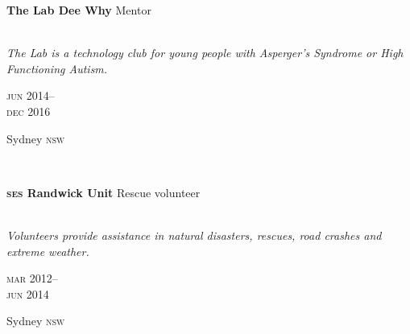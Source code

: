 \begin{minipage}[t]{0.75\textwidth}
\textbf{The Lab Dee Why}\phantom{..} Mentor \\
\\
{\small
\textit{The Lab is a technology club for young people with Asperger’s Syndrome or High Functioning Autism.}
\par}
\end{minipage}
\begin{minipage}[t]{0.25\textwidth}
{
\hfill \textsc{jun} 2014--\\ 
\hspace*{0pt} \hfill \textsc{dec} 2016
\par
{\small\hfill Sydney \textsc{nsw}}
}
\end{minipage}
\\

\begin{minipage}[t]{0.75\textwidth}
\textbf{\textsc{ses} Randwick Unit}\phantom{..} Rescue volunteer\\
\\
{\small
\textit{Volunteers provide assistance in natural disasters, rescues, road crashes and extreme weather.}
\par}
\end{minipage}
\begin{minipage}[t]{0.25\textwidth}
{
\hfill \textsc{mar} 2012--\\ 
\hspace*{0pt} \hfill \textsc{jun} 2014
\par
{\small\hfill Sydney \textsc{nsw}}
}
\end{minipage}



